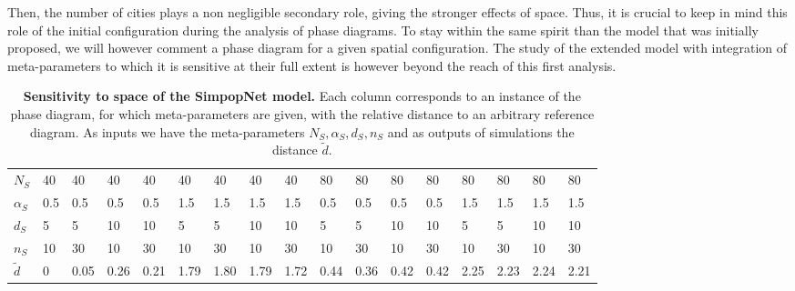 Then, the number of cities plays a non negligible secondary role, giving the stronger effects of space. Thus, it is crucial to keep in mind this role of the initial configuration during the analysis of phase diagrams. To stay within the same spirit than the model that was initially proposed, we will however comment a phase diagram for a given spatial configuration. The study of the extended model with integration of meta-parameters to which it is sensitive at their full extent is however beyond the reach of this first analysis.




\begin{table}[!ht]
\caption{\textbf{Sensitivity to space of the SimpopNet model.} Each column corresponds to an instance of the phase diagram, for which meta-parameters are given, with the relative distance to an arbitrary reference diagram. As inputs we have the meta-parameters $N_S,\alpha_S,d_S,n_S$ and as outputs of simulations the distance $\tilde{d}$.\label{tab:macrocoevolexplo:spacematters}}
\centering
\begin{tabular}{|l|l|l|l|l|l|l|l|l|l|l|l|l|l|l|l|l|}
\hline
$N_S$ & 40 & 40 & 40 & 40 & 40 & 40 & 40 & 40 & 80 & 80 & 80 & 80 & 80 & 80 & 80 & 80\\
$\alpha_S$ & 0.5 & 0.5 & 0.5 & 0.5 & 1.5 & 1.5 & 1.5 & 1.5 & 0.5 & 0.5 & 0.5 & 0.5 & 1.5 & 1.5 & 1.5 & 1.5\\
$d_S$ & 5 & 5 & 10 & 10 & 5 & 5 & 10 & 10 & 5 & 5 & 10 & 10 & 5 & 5 & 10 & 10\\
$n_S$ & 10 & 30 & 10 & 30 & 10 & 30 & 10 & 30 & 10 & 30 & 10 & 30 & 10 & 30 & 10 & 30\\\hline
$\tilde{d}$ & 0 & 0.05 & 0.26 & 0.21 & 1.79 & 1.80 & 1.79 & 1.72 & 0.44 & 0.36 & 0.42 & 0.42 & 2.25 & 2.23 & 2.24 & 2.21\\\hline
\end{tabular}
\end{table}



